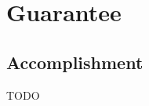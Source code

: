 \section{Guarantee} %
\label{sec:guarantee}

\subsection{Accomplishment} %
\label{sub:accomplishment}
TODO

